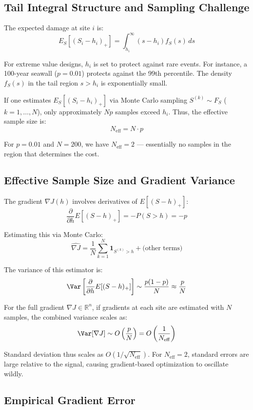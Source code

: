 \documentclass[12pt]{article}
\theoremstyle{definition}
\begin{document}
\subsection{Tail Integral Structure and Sampling Challenge}

The expected damage at site $i$ is:
\[
E_S[(S_i - h_i)_+] = \int_{h_i}^\infty (s - h_i) f_S(s) \, ds
\]

For extreme value designs, $h_i$ is set to protect against rare events. For instance, a 100-year seawall ($p = 0.01$) protects against the 99th percentile. The density $f_S(s)$ in the tail region $s > h_i$ is exponentially small.

If one estimates $E_S[(S_i - h_i)_+]$ via Monte Carlo sampling $S^{(k)} \sim F_S$ ($k=1,\ldots,N$), only approximately $Np$ samples exceed $h_i$. Thus, the effective sample size is:
\[
N_{\text{eff}} = N \cdot p
\]

For $p=0.01$ and $N=200$, we have $N_{\text{eff}} = 2$ --- essentially no samples in the region that determines the cost.

\subsection{Effective Sample Size and Gradient Variance}

The gradient $\nabla J(h)$ involves derivatives of $E[(S-h)_+]$:
\[
\frac{\partial}{\partial h} E[(S-h)_+] = -P(S > h) = -p
\]

Estimating this via Monte Carlo:
\[
\widehat{\nabla J} = \frac{1}{N}\sum_{k=1}^N \mathbf{1}_{S^{(k)} > h} + \text{(other terms)}
\]

The variance of this estimator is:
\[
\Var\left[\frac{\partial}{\partial h}E[(S-h)_+]\right] \sim \frac{p(1-p)}{N} \approx \frac{p}{N}
\]

For the full gradient $\nabla J \in \mathbb{R}^n$, if gradients at each site are estimated with $N$ samples, the combined variance scales as:
\[
\Var[\nabla J] \sim O\left(\frac{p}{N}\right) = O\left(\frac{1}{N_{\text{eff}}}\right)
\]

Standard deviation thus scales as $O(1/\sqrt{N_{\text{eff}}})$. For $N_{\text{eff}}=2$, standard errors are large relative to the signal, causing gradient-based optimization to oscillate wildly.

\subsection{Empirical Gradient Error}
\end{document}
